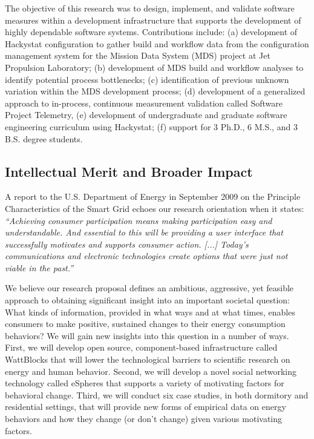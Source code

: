 The objective of this research was to design, implement, and validate
software measures within a development infrastructure that supports the
development of highly dependable software systems.  Contributions include:
(a) development of Hackystat configuration to gather build and workflow
data from the configuration management system for the Mission Data System
(MDS) project at Jet Propulsion Laboratory; (b) development of MDS build
and workflow analyses to identify potential process bottlenecks; (c)
identification of previous unknown variation within the MDS development
process; (d) development of a generalized approach to in-process,
continuous measurement validation called Software Project Telemetry, (e)
development of undergraduate and graduate software engineering curriculum
using Hackystat; (f) support for 3 Ph.D., 6 M.S., and 3 B.S. degree
students.


\subsection{Intellectual Merit and Broader Impact}
\label{sec:merit}

A report to the U.S. Department of Energy in September 2009 on the
Principle Characteristics of the Smart Grid echoes our research orientation
when it states: {\em ``Achieving consumer participation means
  making participation easy and understandable.  And essential to this will
  be providing a user interface that successfully motivates and supports
  consumer action. [...] Today's communications and electronic technologies
  create options that were just not viable in the past.''}
\cite{NETL:EnablesActiveParticipation}

We believe our research proposal defines an ambitious, aggressive, yet
feasible approach to obtaining significant insight into an important
societal question: What kinds of information, provided in what ways and at
what times, enables consumers to make positive, sustained changes to their
energy consumption behaviors?  We will gain new insights into this question
in a number of ways.  First, we will develop open source, component-based
infrastructure called WattBlocks that will lower the technological barriers
to scientific research on energy and human behavior.  Second, we will
develop a novel social networking technology called eSpheres that supports
a variety of motivating factors for behavioral change.  Third, we will
conduct six case studies, in both dormitory and residential settings, that
will provide new forms of empirical data on energy behaviors and how they
change (or don't change) given various motivating factors.

